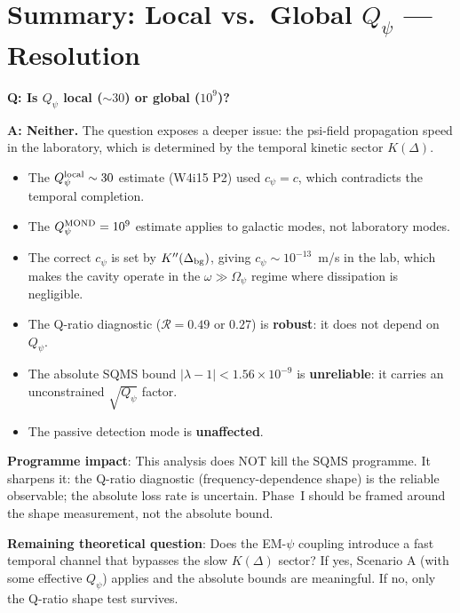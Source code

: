 \documentclass[11pt]{article}
\newcommand{\lbone}{|\lambda - 1|}
\newcommand{\Qpsi}{Q_\psi}
\newcommand{\ee}[1]{\times 10^{#1}}
\newcommand{\Opsi}{\Omega_\psi}
\theoremstyle{definition}
\theoremstyle{remark}
\begin{document}
\section{Summary: Local vs.\ Global $\Qpsi$ --- Resolution}
\label{sec:summary}

\begin{tcolorbox}[colback=green!5!white, colframe=green!50!black,
  title=\textbf{DEFINITIVE ANSWER}]

\textbf{Q: Is $\Qpsi$ local ($\sim 30$) or global ($10^9$)?}

\textbf{A: Neither.} The question exposes a deeper issue: the
psi-field propagation speed in the laboratory, which is determined
by the temporal kinetic sector $K(\Delta)$.

\begin{itemize}[nosep]
\item The $\Qpsi^{\rm local} \sim 30$ estimate (W4i15 P2) used
  $c_\psi = c$, which contradicts the temporal completion.
\item The $\Qpsi^{\rm MOND} = 10^9$ estimate applies to galactic
  modes, not laboratory modes.
\item The correct $c_\psi$ is set by $K''(\Delta_{\rm bg})$, giving
  $c_\psi \sim 10^{-13}$~m/s in the lab, which makes the cavity
  operate in the $\omega \gg \Opsi$ regime where dissipation is
  negligible.
\item The Q-ratio diagnostic ($\mathcal{R} = 0.49$ or $0.27$) is
  \textbf{robust}: it does not depend on $\Qpsi$.
\item The absolute SQMS bound $\lbone < 1.56\ee{-9}$ is
  \textbf{unreliable}: it carries an unconstrained $\sqrt{\Qpsi}$
  factor.
\item The passive detection mode is \textbf{unaffected}.
\end{itemize}

\textbf{Programme impact}: This analysis does NOT kill the SQMS
programme. It sharpens it: the Q-ratio diagnostic (frequency-dependence
shape) is the reliable observable; the absolute loss rate is uncertain.
Phase~I should be framed around the shape measurement, not the
absolute bound.

\textbf{Remaining theoretical question}: Does the EM-$\psi$ coupling
introduce a fast temporal channel that bypasses the slow $K(\Delta)$
sector? If yes, Scenario A (with some effective $\Qpsi$) applies and
the absolute bounds are meaningful. If no, only the Q-ratio shape
test survives.
\end{tcolorbox}
\end{document}
